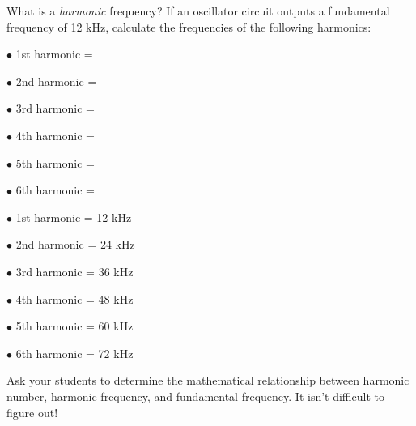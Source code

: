 

What is a {\it harmonic} frequency?  If an oscillator circuit outputs a fundamental frequency of 12 kHz, calculate the frequencies of the following harmonics:

\medskip
\item{$\bullet$} 1st harmonic = 
\item{$\bullet$} 2nd harmonic = 
\item{$\bullet$} 3rd harmonic = 
\item{$\bullet$} 4th harmonic = 
\item{$\bullet$} 5th harmonic = 
\item{$\bullet$} 6th harmonic = 
\medskip







\medskip
\item{$\bullet$} 1st harmonic = 12 kHz
\item{$\bullet$} 2nd harmonic = 24 kHz
\item{$\bullet$} 3rd harmonic = 36 kHz
\item{$\bullet$} 4th harmonic = 48 kHz
\item{$\bullet$} 5th harmonic = 60 kHz
\item{$\bullet$} 6th harmonic = 72 kHz
\medskip







Ask your students to determine the mathematical relationship between harmonic number, harmonic frequency, and fundamental frequency.  It isn't difficult to figure out!




